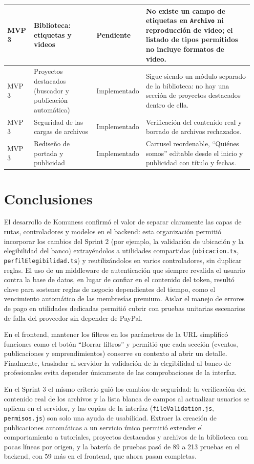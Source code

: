 \begin{longtable}{|p{2cm}|p{5.5cm}|p{2.6cm}|p{4.7cm}|}
\hline
MVP 3 & Biblioteca: etiquetas y videos & Pendiente & No existe un campo de etiquetas en \texttt{Archivo} ni reproducción de video; el listado de tipos permitidos no incluye formatos de video. \\
\hline
MVP 3 & Proyectos destacados (buscador y publicación automática) & Implementado & Sigue siendo un módulo separado de la biblioteca: no hay una sección de proyectos destacados dentro de ella. \\
\hline
MVP 3 & Seguridad de las cargas de archivos & Implementado & Verificación del contenido real y borrado de archivos rechazados. \\
\hline
MVP 3 & Rediseño de portada y publicidad & Implementado & Carrusel reordenable, ``Quiénes somos'' editable desde el inicio y publicidad con título y fechas. \\
\hline
\end{longtable}

\section{Conclusiones}
El desarrollo de Komuness confirmó el valor de separar claramente las capas de rutas, controladores y modelos en el backend: esta organización permitió incorporar los cambios del Sprint 2 (por ejemplo, la validación de ubicación y la elegibilidad del banco) extrayéndolos a utilidades compartidas (\texttt{ubicacion.ts}, \texttt{perfilElegibilidad.ts}) y reutilizándolos en varios controladores, sin duplicar reglas. El uso de un middleware de autenticación que siempre revalida el usuario contra la base de datos, en lugar de confiar en el contenido del token, resultó clave para sostener reglas de negocio dependientes del tiempo, como el vencimiento automático de las membresías premium. Aislar el manejo de errores de pago en utilidades dedicadas permitió cubrir con pruebas unitarias escenarios de falla del proveedor sin depender de PayPal.

En el frontend, mantener los filtros en los parámetros de la URL simplificó funciones como el botón ``Borrar filtros'' y permitió que cada sección (eventos, publicaciones y emprendimientos) conserve su contexto al abrir un detalle. Finalmente, trasladar al servidor la validación de la elegibilidad al banco de profesionales evita depender únicamente de las comprobaciones de la interfaz.

En el Sprint 3 el mismo criterio guió los cambios de seguridad: la verificación del contenido real de los archivos y la lista blanca de campos al actualizar usuarios se aplican en el servidor, y las copias de la interfaz (\texttt{fileValidation.js}, \texttt{permisos.js}) son solo una ayuda de usabilidad. Extraer la creación de publicaciones automáticas a un servicio único permitió extender el comportamiento a tutoriales, proyectos destacados y archivos de la biblioteca con pocas líneas por origen, y la batería de pruebas pasó de 89 a 213 pruebas en el backend, con 59 más en el frontend, que ahora pasan completas.


